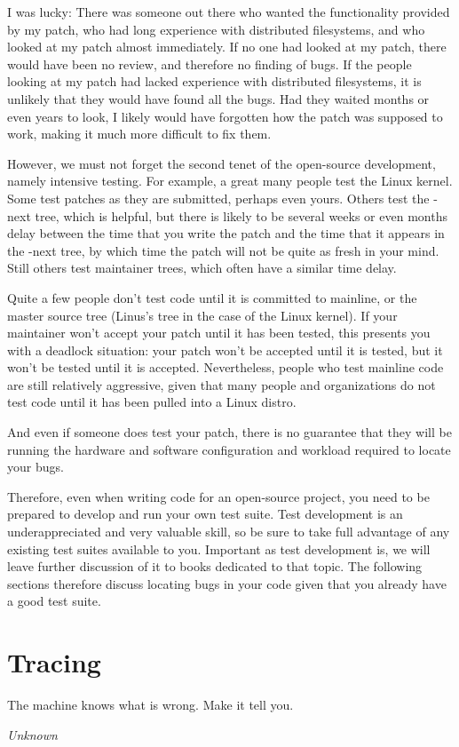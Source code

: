 I was lucky:  There was someone out there who wanted the functionality
provided by my patch, who had long experience with distributed filesystems,
and who looked at my patch almost immediately.
If no one had looked at my patch, there would have been no review, and
therefore no finding of bugs.
If the people looking at my patch had lacked experience with distributed
filesystems, it is unlikely that they would have found all the bugs.
Had they waited months or even years to look, I likely would have forgotten
how the patch was supposed to work, making it much more difficult to
fix them.

However, we must not forget the second tenet of the open-source development,
namely intensive testing.
For example, a great many people test the Linux kernel.
Some test patches as they are submitted, perhaps even yours.
Others test the -next tree, which is helpful, but there is likely to be
several weeks or even months delay between the time that you write the
patch and the time that it appears in the -next tree, by which time the
patch will not be quite as fresh in your mind.
Still others test maintainer trees, which often have a similar time delay.

Quite a few people don't test code until it is committed to mainline,
or the master source tree (Linus's tree in the case of the Linux kernel).
If your maintainer won't accept your patch until it has been tested,
this presents you with a deadlock situation: your patch won't be accepted
until it is tested, but it won't be tested until it is accepted.
Nevertheless, people who test mainline code are still relatively
aggressive, given that many people and organizations do not test code
until it has been pulled into a Linux distro.

And even if someone does test your patch, there is no guarantee that they
will be running the hardware and software configuration and workload
required to locate your bugs.

Therefore, even when writing code for an open-source project, you need to
be prepared to develop and run your own test suite.
Test development is an underappreciated and very valuable skill, so be
sure to take full advantage of any existing test suites available to
you.
Important as test development is, we will leave further discussion of it
to books dedicated to that topic.
The following sections therefore discuss locating bugs in your code given that
you already have a good test suite.

\section{Tracing}
\label{sec:debugging:Tracing}
%
\epigraph{The machine knows what is wrong.  Make it tell you.}{\emph{Unknown}}

